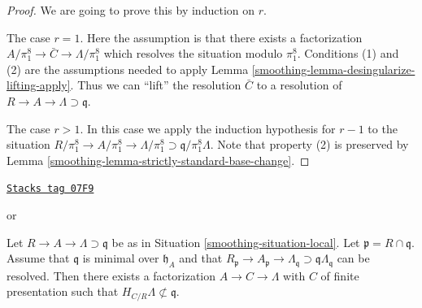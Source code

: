 \begin{proof}

We are going to prove this by induction on $r$.

\medskip\noindent
The case $r = 1$. Here the assumption is that there exists a
factorization $A/\pi_1^8 \to \bar C \to \Lambda/\pi_1^8$
which resolves the situation modulo $\pi_1^8$. Conditions (1) and
(2) are the assumptions needed to apply
Lemma \ref{smoothing-lemma-desingularize-lifting-apply}.
Thus we can ``lift'' the resolution $\bar C$
to a resolution of $R \to A \to \Lambda \supset \mathfrak q$.

\medskip\noindent
The case $r > 1$. In this case we apply the induction hypothesis for $r - 1$
to the situation
$R/\pi_1^8 \to A/\pi_1^8 \to \Lambda/\pi_1^8
\supset \mathfrak q/\pi_1^8\Lambda$.
Note that property (2) is preserved by
Lemma \ref{smoothing-lemma-strictly-standard-base-change}.
\end{proof}

\begin{lemma}
\label{smoothing-lemma-delocalize-weak}
\href{https://stacks.math.columbia.edu/tag/07F9}{\texttt{Stacks tag 07F9}}

\begin{reference}
\cite[Lemma 12.2]{swan} or
\cite[Lemma 2]{popescu-GND}
\end{reference}
Let $R \to A \to \Lambda \supset \mathfrak q$ be as in
Situation \ref{smoothing-situation-local}. Let $\mathfrak p = R \cap \mathfrak q$.
Assume that $\mathfrak q$ is minimal over $\mathfrak h_A$ and that
$R_\mathfrak p \to A_\mathfrak p \to \Lambda_\mathfrak q
\supset \mathfrak q\Lambda_\mathfrak q$ can be resolved.
Then there exists a factorization $A \to C \to \Lambda$ with $C$ of
finite presentation such that $H_{C/R} \Lambda \not \subset \mathfrak q$.
\end{lemma}

